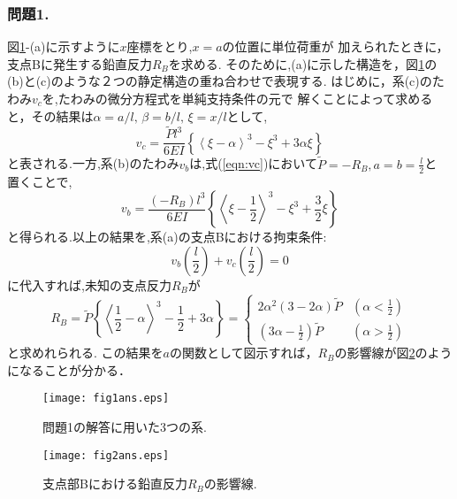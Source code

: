 ﻿\documentclass[10pt,a4j]{jarticle}
\begin{document}
\subsubsection*{問題1.}
図\ref{fig:fig1}-(a)に示すように$x$座標をとり,$x=a$の位置に単位荷重が
加えられたときに，支点Bに発生する鉛直反力$R_B$を求める.
そのために,(a)に示した構造を，図\ref{fig:fig1}の(b)と(c)のような２つの静定構造の重ね合わせで表現する.
はじめに，系(c)のたわみ$v_c$を,たわみの微分方程式を単純支持条件の元で
解くことによって求めると，その結果は$\alpha=a/l,\, \beta=b/l, \, \xi=x/l$として,
\begin{equation}
 v_c=\frac{\tilde Pl^3}{6EI}\left\{
 \left< \xi-\alpha \right>^3 -\xi^3 +3\alpha \xi 
 \right\}
 \label{eqn:vc}
\end{equation}
と表される.一方,系(b)のたわみ$v_b$は,式(\ref{eqn:vc})において$\tilde P=-R_B, a=b=\frac{l}{2}$と
置くことで,
\begin{equation}
 v_b=\frac{(-R_B)l^3}{6EI}\left\{
		\left< \xi-\frac{1}{2} \right>^3 -\xi^3 +\frac{3}{2}\xi 
	\right\}
	\label{eqn:vb}
\end{equation}
と得られる.以上の結果を,系(a)の支点Bにおける拘束条件:
\begin{equation}
	v_b\left(\frac{l}{2}\right) 
	+
	v_c\left(\frac{l}{2}\right) =0
\end{equation}
に代入すれば,未知の支点反力$R_B$が
\begin{equation}
	R_B=
	\tilde P
	\left\{
		\left< \frac{1}{2}-\alpha \right>^3-\frac{1}{2}+3\alpha
	\right\}
	=\left\{
	\begin{array}{cc}
		2\alpha^2(3-2\alpha)\tilde P & \left(\alpha < \frac{1}{2}\right) \\
		\left(3\alpha-\frac{1}{2}\right)\tilde P & \left(\alpha > \frac{1}{2}\right)
	\end{array}
	\right.
	\label{eqn:RB}
\end{equation}
と求めれられる.
この結果を$a$の関数として図示すれば，$R_B$の影響線が図\ref{fig:fig2}のようになることが分かる．
\begin{figure}[h]
	\begin{center}
	\texttt{[image: fig1ans.eps]}
	\end{center}
	\caption{問題1の解答に用いた3つの系.}
	\label{fig:fig1}
\end{figure}
\begin{figure}[h]
	\begin{center}
	\texttt{[image: fig2ans.eps]} 
	\end{center}
	\caption{支点部Bにおける鉛直反力$R_B$の影響線.}
	\label{fig:fig2}
\end{figure}
%
%
\end{document}
